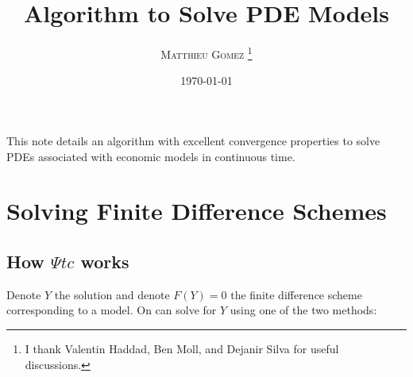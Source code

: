 \documentclass[english]{article}
\begin{document}
\title{Algorithm to Solve PDE Models}
\author{\large{\textsc{Matthieu Gomez \thanks{I thank Valentin Haddad, Ben Moll, and Dejanir Silva for useful discussions.}}}}
\date{\today}
\maketitle
This note details an algorithm with excellent convergence properties to solve PDEs associated with economic models in continuous time.

\section{Solving Finite Difference Schemes}

\subsection{How $\Psi tc$ works}
Denote $Y$  the solution and denote $F(Y) = 0$ the finite difference scheme corresponding to a model. On can solve for $Y$ using one of the two methods:
\end{document}
